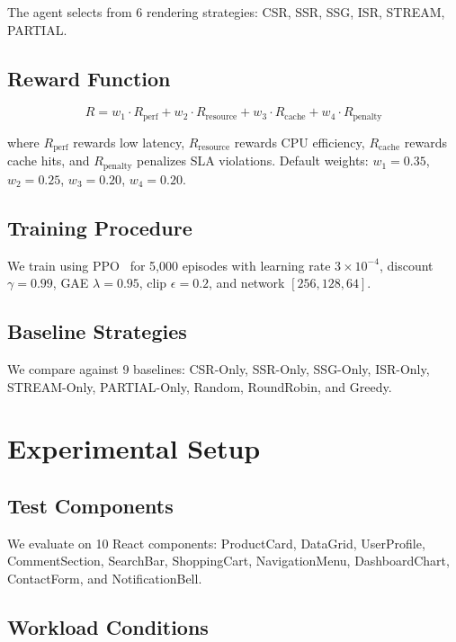 \documentclass[10pt,twocolumn]{article}
\begin{document}
The agent selects from 6 rendering strategies: CSR, SSR, SSG, ISR, STREAM, PARTIAL.

\subsection{Reward Function}

\begin{equation}
R = w_1 \cdot R_{\text{perf}} + w_2 \cdot R_{\text{resource}} + w_3 \cdot R_{\text{cache}} + w_4 \cdot R_{\text{penalty}}
\end{equation}

where $R_{\text{perf}}$ rewards low latency, $R_{\text{resource}}$ rewards CPU efficiency, $R_{\text{cache}}$ rewards cache hits, and $R_{\text{penalty}}$ penalizes SLA violations. Default weights: $w_1=0.35$, $w_2=0.25$, $w_3=0.20$, $w_4=0.20$.

\subsection{Training Procedure}

We train using PPO~\cite{schulman2017ppo} for 5,000 episodes with learning rate $3 \times 10^{-4}$, discount $\gamma=0.99$, GAE $\lambda=0.95$, clip $\epsilon=0.2$, and network $[256, 128, 64]$.

\subsection{Baseline Strategies}

We compare against 9 baselines: CSR-Only, SSR-Only, SSG-Only, ISR-Only, STREAM-Only, PARTIAL-Only, Random, RoundRobin, and Greedy.

\section{Experimental Setup}
\label{sec:experimental}

\subsection{Test Components}

We evaluate on 10 React components: ProductCard, DataGrid, UserProfile, CommentSection, SearchBar, ShoppingCart, NavigationMenu, DashboardChart, ContactForm, and NotificationBell.

\subsection{Workload Conditions}
\end{document}
